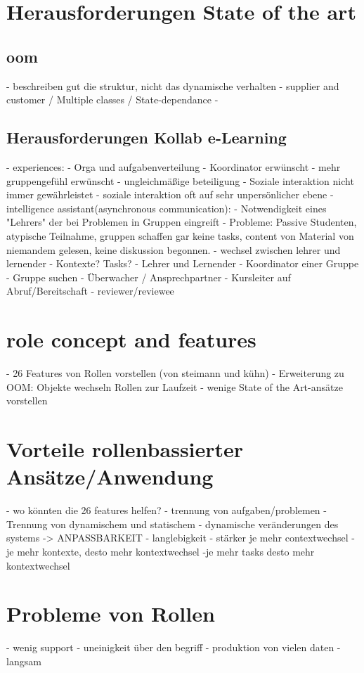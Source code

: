 \documentclass[conference]{IEEEtran}
\begin{document}
\section{Herausforderungen State of the art}
\subsection{oom}
- beschreiben gut die struktur, nicht das dynamische verhalten
- supplier and customer / Multiple classes / State-dependance
- 
\subsection{Herausforderungen Kollab e-Learning}
- experiences: 
	- Orga und aufgabenverteilung
	- Koordinator erwünscht
	- mehr gruppengefühl erwünscht
	- ungleichmäßige beteiligung
- Soziale interaktion nicht immer gewährleistet
	- soziale interaktion oft auf sehr unpersönlicher ebene
- intelligence assistant(asynchronous communication):
	- Notwendigkeit eines "Lehrers" der bei Problemen in Gruppen eingreift
		- Probleme: Passive Studenten, atypische Teilnahme, gruppen schaffen gar keine tasks, content von Material von niemandem gelesen, keine diskussion begonnen.
- wechsel zwischen lehrer und lernender
- Kontexte? Tasks?  
	- Lehrer und Lernender
	- Koordinator einer Gruppe
	- Gruppe suchen
	- Überwacher / Ansprechpartner
	- Kursleiter auf Abruf/Bereitschaft
	- reviewer/reviewee


\section{role concept and features}
- 26 Features von Rollen vorstellen (von steimann und kühn)
- Erweiterung zu OOM: Objekte wechseln Rollen zur Laufzeit
- wenige State of the Art-ansätze vorstellen


\section{Vorteile rollenbassierter Ansätze/Anwendung}
- wo könnten die 26 features helfen? 
- trennung von aufgaben/problemen
- Trennung von dynamischem und statischem
- dynamische veränderungen des systems -> ANPASSBARKEIT
- langlebigkeit
- stärker je mehr contextwechsel
	-je mehr kontexte, desto mehr kontextwechsel
		-je mehr tasks desto mehr kontextwechsel

\section{Probleme von Rollen}
- wenig support
- uneinigkeit über den begriff 
- produktion von vielen daten
- langsam
\end{document}
